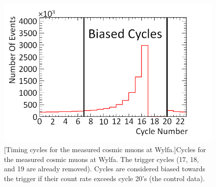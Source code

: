 
\begin{figure}[!h]
 \centering
 \includegraphics[width=0.7\linewidth]{Chapter6/Figs/Raster/badCyclesRedoMedText.png}
 [Timing cycles for the measured cosmic muons at Wylfa.]{Cycles for the measured cosmic muons at Wylfa. The trigger cycles (17, 18, and 19 are already removed). Cycles are considered biased towards the trigger if their count rate exceeds cycle 20's (the control data).} 
 \label{fig:badCycles}
\end{figure}

